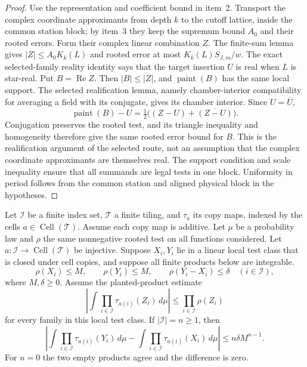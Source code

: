 \begin{proof}
Use the representation and coefficient bound in item~2. Transport the
complex coordinate approximants from depth $k$ to the cutoff lattice, inside
the common station block; by item~3 they keep the supremum bound $A_0$ and
their rooted errors. Form their complex linear combination $Z$. The finite-sum
lemma gives $|Z|\leq A_0K_k(L)$ and rooted error at most
$K_k(L)S_{J,m}/w$. The exact selected-family reality identity says that the
target insertion $U$ is real when $L$ is star-real. Put $B=\operatorname{Re}Z$.
Then $|B|\leq|Z|$, and $\operatorname{paint}(B)$ has the same local support.
The selected realification lemma, namely chamber-interior compatibility for
averaging a field with its conjugate, gives its chamber interior. Since
$U=\overline U$,
\[
 \operatorname{paint}(B)-U
   =\tfrac12\bigl((Z-U)+\overline{(Z-U)}\bigr).
\]
Conjugation preserves the rooted test, and its triangle inequality and
homogeneity therefore give the same rooted error bound for $B$. This is the
realification argument of the selected route, not an assumption that the
complex coordinate approximants are themselves real. The support condition
and scale inequality ensure that all summands are legal tests in one block.
Uniformity in period follows from the common station and aligned physical
block in the hypotheses.
\end{proof}

\begin{lemma}
\label{lem:ex-public-replace-word}
Let $\mathcal I$ be a finite index set, $\mathcal T$ a finite tiling, and
$\tau_a$ its copy maps, indexed by the cells $a\in\operatorname{Cell}(\mathcal
T)$. Assume each copy map is additive. Let $\mu$ be a probability law and
$\rho$ the same nonnegative rooted test on all functions considered. Let
$a:\mathcal I\to\operatorname{Cell}(\mathcal T)$ be injective. Suppose
$X_i,Y_i$ lie in a linear local test class that is closed under cell copies,
and suppose all finite products below are integrable.
\[
 \rho(X_i)\leq M,\qquad \rho(Y_i)\leq M,\qquad
 \rho(Y_i-X_i)\leq\delta
 \quad(i\in\mathcal I),
\]
where $M,\delta\geq0$. Assume the planted-product estimate
\[
 \left|\int\prod_{i\in\mathcal I}\tau_{a(i)}(Z_i)\,d\mu\right|
       \leq\prod_{i\in\mathcal I}\rho(Z_i)
\]
for every family in this local test class. If $|\mathcal I|=n\geq1$, then
\[
 \left|\int\prod_{i\in\mathcal I}\tau_{a(i)}(Y_i)\,d\mu
       -\int\prod_{i\in\mathcal I}\tau_{a(i)}(X_i)\,d\mu\right|
       \leq n\delta M^{n-1}.
\]
For $n=0$ the two empty products agree and the difference is zero.
\end{lemma}

